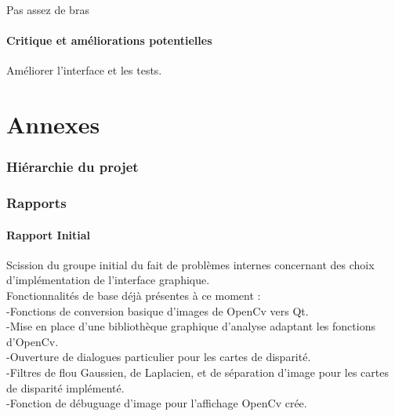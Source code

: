 \documentclass{article}
\begin{document}
Pas assez de bras

\subsection{Critique et améliorations potentielles}

Améliorer l'interface et les tests.

\newpage
\appendix
\part{Annexes}

\listoffigures

\newpage
\section{Hiérarchie du projet}



\newpage
\section{Rapports}
\subsection{Rapport Initial}
Scission du groupe initial du fait de problèmes internes concernant des choix d'implémentation de l'interface graphique.\\

Fonctionnalités de base déjà présentes à ce moment :\\
	-Fonctions de conversion basique d'images de OpenCv vers Qt.\\
	-Mise en place d'une bibliothèque graphique d'analyse adaptant les fonctions d'OpenCv.\\
	-Ouverture de dialogues particulier pour les cartes de disparité.\\
	-Filtres de flou Gaussien, de Laplacien, et de séparation d'image pour les cartes de disparité implémenté.\\
	-Fonction de débuguage d'image pour l'affichage OpenCv crée.\\
\end{document}
